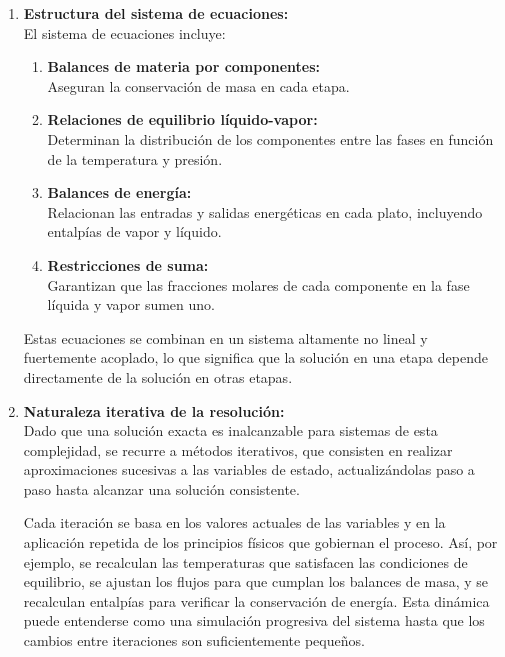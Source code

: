 \begin{enumerate}
      \item \textbf{Estructura del sistema de ecuaciones:}\\
            El sistema de ecuaciones incluye:
            \begin{enumerate}
                  \item \textbf{Balances de materia por componentes:}\\
                        Aseguran la conservación de masa en cada etapa.
                  \item \textbf{Relaciones de equilibrio líquido-vapor:}\\
                        Determinan la distribución de los componentes entre las fases en función de la temperatura y presión.
                  \item \textbf{Balances de energía:}\\
                        Relacionan las entradas y salidas energéticas en cada plato, incluyendo entalpías de vapor y líquido.
                  \item \textbf{Restricciones de suma:}\\
                        Garantizan que las fracciones molares de cada componente en la fase líquida y vapor sumen uno.
            \end{enumerate}

            Estas ecuaciones se combinan en un sistema altamente no lineal y fuertemente acoplado, lo que significa que la solución en una etapa depende directamente de la solución en otras etapas.

      \item \textbf{Naturaleza iterativa de la resolución:}\\
            Dado que una solución exacta es inalcanzable para sistemas de esta complejidad, se recurre a métodos iterativos, que consisten en realizar aproximaciones sucesivas a las variables de estado, actualizándolas paso a paso hasta alcanzar una solución consistente.

            Cada iteración se basa en los valores actuales de las variables y en la aplicación repetida de los principios físicos que gobiernan el proceso. Así, por ejemplo, se recalculan las temperaturas que satisfacen las condiciones de equilibrio, se ajustan los flujos para que cumplan los balances de masa, y se recalculan entalpías para verificar la conservación de energía. Esta dinámica puede entenderse como una simulación progresiva del sistema hasta que los cambios entre iteraciones son suficientemente pequeños.


\end{enumerate}
